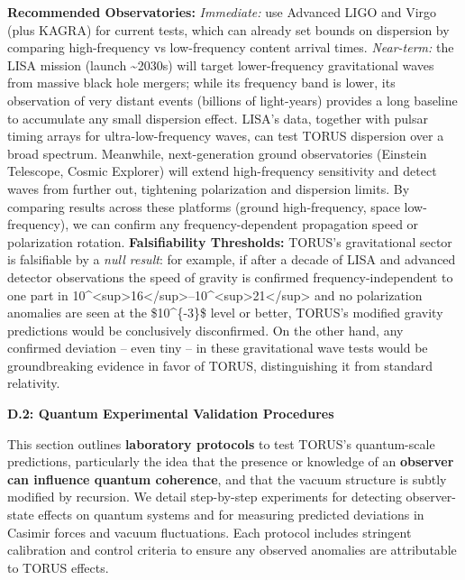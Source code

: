 \documentclass[
]{article}
\begin{document}
\textbf{Recommended Observatories:} \emph{Immediate:} use Advanced LIGO
and Virgo (plus KAGRA) for current tests, which can already set bounds
on dispersion by comparing high-frequency vs low-frequency content
arrival times\hspace{0pt}. \emph{Near-term:} the LISA mission (launch
\textasciitilde2030s) will target lower-frequency gravitational waves
from massive black hole mergers; while its frequency band is lower, its
observation of very distant events (billions of light-years) provides a
long baseline to accumulate any small dispersion effect\hspace{0pt}.
LISA's data, together with pulsar timing arrays for ultra-low-frequency
waves, can test TORUS dispersion over a broad spectrum. Meanwhile,
next-generation ground observatories (Einstein Telescope, Cosmic
Explorer) will extend high-frequency sensitivity and detect waves from
further out, tightening polarization and dispersion limits. By comparing
results across these platforms (ground high-frequency, space
low-frequency), we can confirm any frequency-dependent propagation speed
or polarization rotation. \textbf{Falsifiability Thresholds:} TORUS's
gravitational sector is falsifiable by a \emph{null result}: for
example, if after a decade of LISA and advanced detector observations
the speed of gravity is confirmed frequency-independent to one part in
10\^{}\textless sup\textgreater16\textless/sup\textgreater--10\^{}\textless sup\textgreater21\textless/sup\textgreater{}
and no polarization anomalies are seen at the \$10\^{}\{-3\}\$ level or
better, TORUS's modified gravity predictions would be conclusively
disconfirmed\hspace{0pt}. On the other hand, any confirmed deviation --
even tiny -- in these gravitational wave tests would be groundbreaking
evidence in favor of TORUS, distinguishing it from standard relativity.

\textbf{D.2: Quantum Experimental Validation Procedures}

This section outlines \textbf{laboratory protocols} to test TORUS's
quantum-scale predictions, particularly the idea that the presence or
knowledge of an \textbf{observer can influence quantum coherence}, and
that the vacuum structure is subtly modified by recursion. We detail
step-by-step experiments for detecting observer-state effects on quantum
systems and for measuring predicted deviations in Casimir forces and
vacuum fluctuations. Each protocol includes stringent calibration and
control criteria to ensure any observed anomalies are attributable to
TORUS effects.
\end{document}
